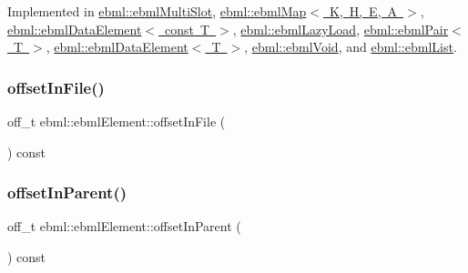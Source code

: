 Implemented in \mbox{\hyperlink{classebml_1_1ebmlMultiSlot_a3a2407406cd68f27d974cc18223c86c0}{ebml\+::ebml\+Multi\+Slot}}, \mbox{\hyperlink{classebml_1_1ebmlMap_a44366a7b060c58b3fbe4e65c31481efc}{ebml\+::ebml\+Map$<$ K, H, E, A $>$}}, \mbox{\hyperlink{classebml_1_1ebmlDataElement_3_01const_01T_01_4_aa5a82c4528609bf788caf8db8927fbc1}{ebml\+::ebml\+Data\+Element$<$ const T $>$}}, \mbox{\hyperlink{classebml_1_1ebmlLazyLoad_a745a171ad2f89827ffb2f9d09f49e47e}{ebml\+::ebml\+Lazy\+Load}}, \mbox{\hyperlink{classebml_1_1ebmlPair_a88a68eed87260a46f40371f14279da4e}{ebml\+::ebml\+Pair$<$ T $>$}}, \mbox{\hyperlink{classebml_1_1ebmlDataElement_a721eb3bfcb545510f2cebad65776f1bd}{ebml\+::ebml\+Data\+Element$<$ T $>$}}, \mbox{\hyperlink{classebml_1_1ebmlVoid_ad9baeb00b771d3ae4cdebb2078f863ad}{ebml\+::ebml\+Void}}, and \mbox{\hyperlink{classebml_1_1ebmlList_a49cf343c62058b121e7c546e8afa0947}{ebml\+::ebml\+List}}.

\mbox{\label{classebml_1_1ebmlElement_ab9f3e77ee8dcab574942f5402619fbb9}} 
\subsubsection{\texorpdfstring{offset\+In\+File()}{offsetInFile()}}
{\footnotesize\ttfamily off\+\_\+t ebml\+::ebml\+Element\+::offset\+In\+File (\begin{DoxyParamCaption}{ }\end{DoxyParamCaption}) const}

\mbox{\label{classebml_1_1ebmlElement_a10df5e4a342a2ec9682de0faec4f470c}} 
\subsubsection{\texorpdfstring{offset\+In\+Parent()}{offsetInParent()}}
{\footnotesize\ttfamily off\+\_\+t ebml\+::ebml\+Element\+::offset\+In\+Parent (\begin{DoxyParamCaption}{ }\end{DoxyParamCaption}) const}

\mbox{\label{classebml_1_1ebmlElement_aa6e265beb13dae353d75cdacc77748e1}} 
